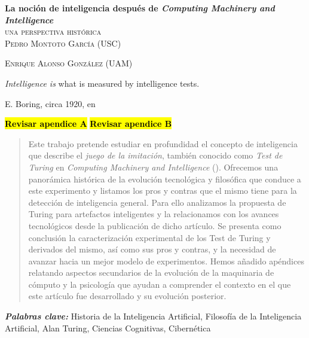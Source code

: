 \documentclass[12pt]{memoir}
\makeatletter
\newlength\drop
\newcommand*\titleM{\begingroup%
\setlength\drop{0.08\textheight}
\centering
\vspace*{\drop}
{\Huge\bfseries La noción de inteligencia después de \textit{Computing Machinery and Intelligence}}\\[\baselineskip]
{\scshape una perspectiva histórica}\\[\baselineskip]
\vfill
{\large\scshape Pedro Montoto García (USC)}\par
{\large\scshape Enrique Alonso González (UAM)}\par
\vfill
{\scshape \@date}\par
\vspace*{2\drop}
\endgroup}
\providecommand{\keywords}[2]{
	\textbf{\textit{#1: }} #2
}
\makeatother
\begin{document}
\pagestyle{empty}


\begin{titlingpage}
\titleM
\end{titlingpage}

\OnehalfSpacing



\setlength{\epigraphwidth}{0.8\textwidth}
\thispagestyle{empty}
\epigraph{\flqq\textit{Intelligence is} what is measured by intelligence tests.\frqq}{E. Boring, circa 1920, en \cite{intDefs}}

\textcolor{red}{\textbf{\hl{Revisar apendice A}}}
\textcolor{red}{\textbf{\hl{Revisar apendice B}}}
\newpage


\thispagestyle{empty}
\begin{abstract}
	Este trabajo pretende estudiar en profundidad el concepto de inteligencia que describe el \textit{juego de la imitación}, también conocido como \textit{Test de Turing} en \textit{Computing Machinery and Intelligence} (\cite{Turing1950cmi}). Ofrecemos una panorámica histórica de la evolución tecnológica y filosófica que conduce a este experimento y listamos los pros y contras que el mismo tiene para la detección de inteligencia general. Para ello analizamos la propuesta de Turing para artefactos inteligentes y la relacionamos con los avances tecnológicos desde la publicación de dicho artículo. Se presenta como conclusión la caracterización experimental de los Test de Turing y derivados del mismo, así como sus pros y contras, y la necesidad de avanzar hacia un mejor modelo de experimentos. Hemos añadido apéndices relatando aspectos secundarios de la evolución de la maquinaria de cómputo y la psicología que ayudan a comprender el contexto en el que este artículo fue desarrollado y su evolución posterior.
\end{abstract}

\nocite{Nilsson2009}

\keywords{Palabras clave}{Historia de la Inteligencia Artificial, Filosofía de la Inteligencia Artificial, Alan Turing, Ciencias Cognitivas, Cibernética}

\begin{otherlanguage}{english}
\begin{abstract}
\end{abstract}
\end{otherlanguage}
\end{document}
